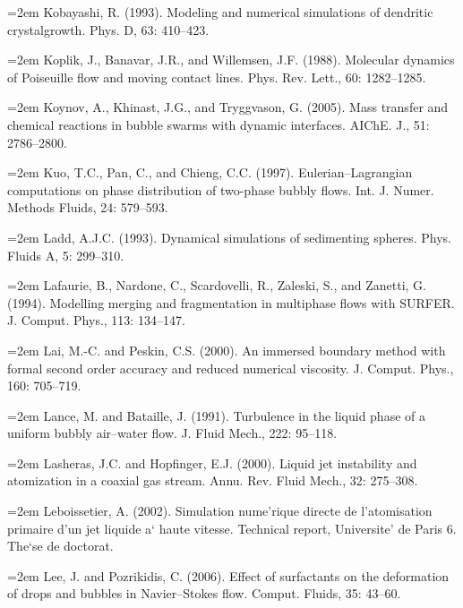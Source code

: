 \documentclass[11pt,a4paper,openany,fontset=none]{ctexbook}
\begin{document}
\par\hangindent=2em Kobayashi, R. (1993). Modeling and numerical simulations of dendritic crystalgrowth. Phys. D, 63: 410--423.

\par\hangindent=2em Koplik, J., Banavar, J.R., and Willemsen, J.F. (1988). Molecular dynamics of Poiseuille flow and moving contact lines. Phys. Rev. Lett., 60: 1282--1285.

\par\hangindent=2em Koynov, A., Khinast, J.G., and Tryggvason, G. (2005). Mass transfer and chemical reactions in bubble swarms with dynamic interfaces. AIChE. J., 51: 2786--2800.

\par\hangindent=2em Kuo, T.C., Pan, C., and Chieng, C.C. (1997). Eulerian--Lagrangian computations on phase distribution of two-phase bubbly flows. Int. J. Numer. Methods Fluids, 24: 579--593.

\par\hangindent=2em Ladd, A.J.C. (1993). Dynamical simulations of sedimenting spheres. Phys. Fluids A, 5: 299--310.

\par\hangindent=2em Lafaurie, B., Nardone, C., Scardovelli, R., Zaleski, S., and Zanetti, G. (1994). Modelling merging and fragmentation in multiphase flows with SURFER. J. Comput. Phys., 113: 134--147.

\par\hangindent=2em Lai, M.-C. and Peskin, C.S. (2000). An immersed boundary method with formal second order accuracy and reduced numerical viscosity. J. Comput. Phys., 160: 705--719.

\par\hangindent=2em Lance, M. and Bataille, J. (1991). Turbulence in the liquid phase of a uniform bubbly air--water flow. J. Fluid Mech., 222: 95--118.

\par\hangindent=2em Lasheras, J.C. and Hopfinger, E.J. (2000). Liquid jet instability and atomization in a coaxial gas stream. Annu. Rev. Fluid Mech., 32: 275--308.

\par\hangindent=2em Leboissetier, A. (2002). Simulation nume'rique directe de l’atomisation primaire d’un jet liquide a` haute vitesse. Technical report, Universite' de Paris 6. The`se de doctorat.


\par\hangindent=2em Lee, J. and Pozrikidis, C. (2006). Effect of surfactants on the deformation of drops and bubbles in Navier--Stokes flow. Comput. Fluids, 35: 43--60.
\end{document}
